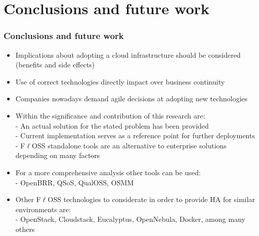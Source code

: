\section{Conclusions and future work}

\begin{frame}[allowframebreaks]
\frametitle{Conclusions and future work}

\begin{itemize}
  \item Implications about adopting a cloud infrastructure should be considered (benefits and side effects)
  \item Use of correct technologies directly impact over business continuity
  \item Companies nowadays demand agile decisions at adopting new technologies
  \item Within the significance and contribution of this research are:\\
  - An actual solution for the stated problem has been provided\\
  - Current implementation serves as a reference point for further deployments\\
  - F$\ell$OSS standalone tools are an alternative to enterprise solutions depending on many factors
  \item For a more comprehensive analysis other tools can be used:\\
  - OpenBRR, QSoS, QualOSS, OSMM
  \item Other F$\ell$OSS technologies to considerate in order to provide HA for similar environments are:\\
  - OpenStack, Cloudstack, Eucalyptus, OpenNebula, Docker, among many others
  
\end{itemize}

\end{frame}